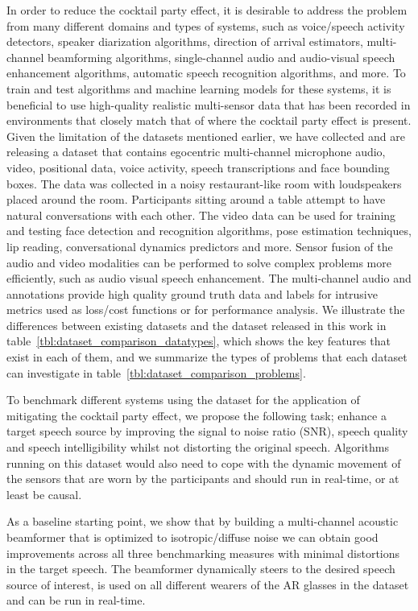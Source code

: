 \documentclass[journal]{IEEEtran}
\begin{document}
In order to reduce the cocktail party effect, it is desirable to address the problem from many different domains and types of systems, such as voice/speech activity detectors, speaker diarization algorithms, direction of arrival estimators, multi-channel beamforming algorithms, single-channel audio and audio-visual speech enhancement algorithms,  automatic speech recognition algorithms, and more.
To train and test algorithms and machine learning models for these systems, it is beneficial to use high-quality realistic multi-sensor data that has been recorded in environments that closely match that of where the cocktail party effect is present.
Given the limitation of the datasets mentioned earlier, we have collected and are releasing a dataset that contains egocentric multi-channel microphone audio, video, positional data, voice activity, speech transcriptions and face bounding boxes.
The data was collected in a noisy restaurant-like room with loudspeakers placed around the room.
Participants sitting around a table attempt to have natural conversations with each other.
The video data can be used for training and testing face detection and recognition algorithms, pose estimation techniques, lip reading, conversational dynamics predictors and more.
Sensor fusion of the audio and video modalities can be performed to solve complex problems more efficiently, such as audio visual speech enhancement.
The multi-channel audio and annotations provide high quality ground truth data and labels for intrusive metrics used as loss/cost functions or for performance analysis.
We illustrate the differences between existing datasets and the dataset released in this work in table~\ref{tbl:dataset_comparison_datatypes}, which shows the key features that exist in each of them, and we summarize the types of problems that each dataset can investigate in table~\ref{tbl:dataset_comparison_problems}.

To benchmark different systems using the dataset for the application of mitigating the cocktail party effect, we propose the following task;
enhance a target speech source by improving the signal to noise ratio (SNR), speech quality and speech intelligibility whilst not distorting the original speech.
Algorithms running on this dataset would also need to cope with the dynamic movement of the sensors that are worn by the participants and should run in real-time, or at least be causal.

As a baseline starting point, we show that by building a multi-channel acoustic beamformer that is optimized to isotropic/diffuse noise we can obtain good improvements across all three benchmarking measures with minimal distortions in the target speech.
The beamformer dynamically steers to the desired speech source of interest, is used on all different wearers of the AR glasses in the dataset and can be run in real-time.
\end{document}
